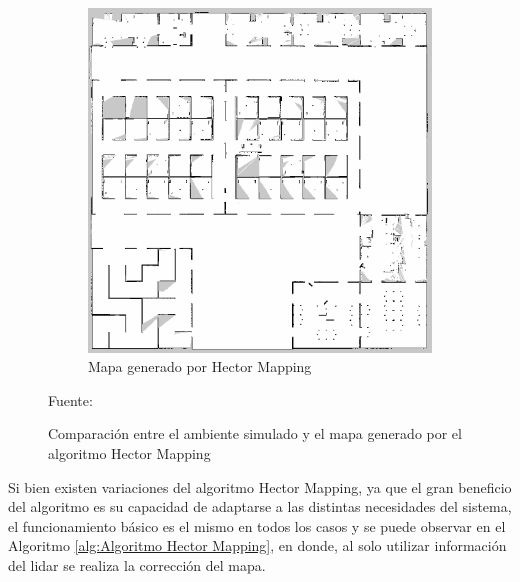 \begin{figure}[H]
\begin{subfigure}[b]{0.40\textwidth}
    \includegraphics[width=\textwidth, height=\textwidth]{figures/02marco_conceptual/hector_slam_map.png}
    \caption{Mapa generado por Hector Mapping}
    \label{fig:hector_slam_map}
    \end{subfigure}
    \caption{Comparación entre el ambiente simulado y el mapa generado por el algoritmo Hector Mapping}
    Fuente: \cite{kohlbrecher_flexible_2011}
    \label{fig:hector_slam_work}
\end{figure}

Si bien existen variaciones del algoritmo Hector Mapping, ya que el gran beneficio del algoritmo es su capacidad de adaptarse a las distintas necesidades del sistema, el funcionamiento básico es el mismo en todos los casos y se puede observar en el Algoritmo \ref{alg:Algoritmo Hector Mapping}, en donde, al solo utilizar información del lidar se realiza la corrección del mapa. 

